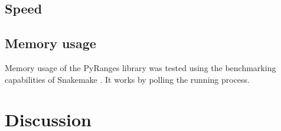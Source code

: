 \documentclass[10pt,letterpaper]{article}
\begin{document}
\subsection*{Speed}



\subsection*{Memory usage}

Memory usage of the PyRanges library was tested using the benchmarking
capabilities of Snakemake \cite{doi:10.1093/bioinformatics/bty350}. It works by
polling the running process.



\section*{Discussion}
\end{document}
